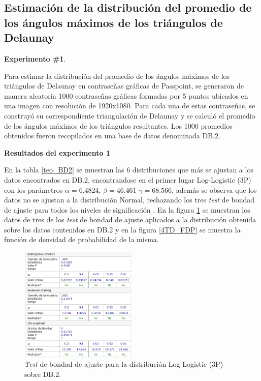 \documentclass[12pt]{report}
\begin{document}
\subsection{Estimación de la distribución del promedio de los ángulos máximos de los triángulos de Delaunay }
\textbf{Experimento \#1}.

Para estimar la distribución del promedio de los ángulos máximos de los triángulos de Delaunay en contraseñas gráficas de Passpoint, se generaron de manera aleatoria 1000 contraseñas gráficas formadas por 5 puntos ubicados en una imagen con resolución de 1920x1080. Para cada una de estas contraseñas, se construyó su correspondiente triangulación de Delaunay y se calculó el promedio de los ángulos máximos de los triángulos resultantes. Los 1000 promedios obtenidos fueron recopilados en una base de datos denominada DB.2.


\textbf{Resultados del experimento 1}

En la tabla \ref{teo_BD2}  se muestran las 6 distribuciones que más se ajustan a los datos encontrados en DB.2, encontrandose en el primer lugar Log-Logistic (3P) con los parámetros $\alpha=6.4824$, $\beta=46.461$ $\gamma=68.566$, además se observa que los datos no se ajustan a la distribución Normal, rechazando los tres \textit{test} de bondad de ajuste para todos los niveles de significación . En la figura \ref{4TD_BONDAD} se  muestran los datos de tres de los \textit{test} de bondad de ajuste aplicados a la distribución obtenida sobre los datos contenidos en DB.2 y en la figura \ref{4TD_FDP} se muestra la función de densidad de probabilidad de la misma. 
\begin{figure}[ht]
	\centering
	
	\includegraphics[width=0.5\textwidth]{4td_bondad.png}
	\caption{\textit{Test} de bondad de ajuste para la distribución Log-Logistic (3P) sobre DB.2.}
	\label{4TD_BONDAD}
\end{figure}
\end{document}
